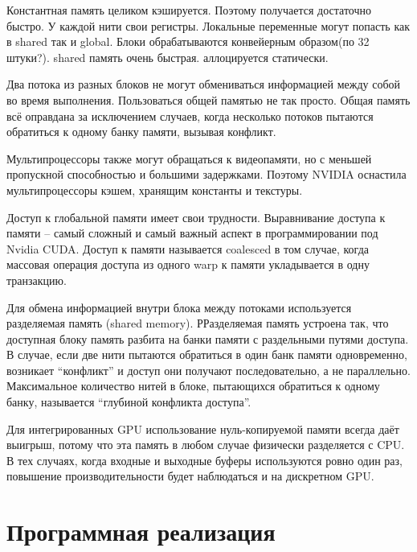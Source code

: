 \documentclass[a4paper,14pt,russian]{extreport}
\begin{document}
\par
Константная память целиком кэшируется. Поэтому получается достаточно быстро. У каждой нити свои регистры. Локальные переменные могут попасть как в shared так и global. Блоки обрабатываются конвейерным образом(по 32 штуки?). shared память очень быстрая. аллоцируется статически. 
\par 
Два потока из разных блоков не могут обмениваться информацией между собой во время выполнения. Пользоваться общей памятью не так просто. Общая память всё оправдана за исключением случаев, когда несколько потоков пытаются обратиться к одному банку памяти, вызывая конфликт. 
\par 
Мультипроцессоры также могут обращаться к видеопамяти, но с меньшей пропускной способностью и большими задержками. Поэтому NVIDIA оснастила мультипроцессоры кэшем, хранящим константы и текстуры. 
\par 
Доступ к глобальной памяти имеет свои трудности. Выравнивание доступа к памяти – самый сложный и самый важный аспект в программировании под Nvidia CUDA. Доступ к памяти называется coalesced в том случае, когда массовая операция доступа из одного warp к памяти укладывается в одну транзакцию.
\par 
Для обмена информацией внутри блока между потоками используется разделяемая память (shared memory). РРазделяемая память устроена так, что доступная блоку память разбита на банки памяти с раздельными путями доступа. В случае, если две нити пытаются обратиться в один банк памяти одновременно, возникает “конфликт” и доступ они получают последовательно, а не параллельно. Максимальное количество нитей в блоке, пытающихся обратиться к одному банку, называется “глубиной конфликта доступа”.
\par 
Для интегрированных GPU использование нуль-копируемой памяти всегда даёт выигрыш, потому что эта память в любом случае физически разделяется с CPU. В тех случаях, когда входные и выходные буферы используются ровно один раз, повышение производительности будет наблюдаться и на дискретном GPU.

\section{Программная реализация}
\end{document}
